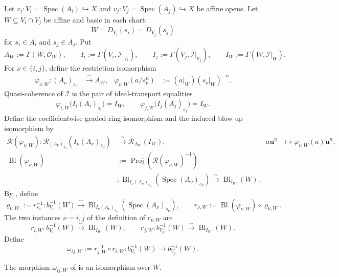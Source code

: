 \begin{definition}
  Let $v_i\colon V_i=\operatorname{Spec}(A_i)\hookrightarrow X$ and
  $v_j\colon V_j=\operatorname{Spec}(A_j)\hookrightarrow X$ be affine
  opens.  Let $W\subseteq V_i\cap V_j$ be affine and basic in each chart:
  \[
    W=D_{V_i}(s_i)=D_{V_j}(s_j)
  \]
  for $s_i\in A_i$ and $s_j\in A_j$.  Put
  \[
    A_W:=\Gamma(W,\mathcal O_W),\qquad
    I_i:=\Gamma(V_i,\mathcal I|_{V_i}),\qquad
    I_j:=\Gamma(V_j,\mathcal I|_{V_j}),\qquad
    I_W:=\Gamma(W,\mathcal I|_W).
  \]
  For $\nu\in\{i,j\}$, define the restriction isomorphism
  \[
  \begin{aligned}
    \varphi_{\nu,W}\colon(A_\nu)_{s_\nu}
      &\xrightarrow{\ \sim\ }A_W,&
    \varphi_{\nu,W}(a/s_\nu^n)
      &:=(a|_W)(s_\nu|_W)^{-n}.
  \end{aligned}
  \]
  Quasi-coherence of $\mathcal I$ is the pair of ideal-transport equalities
  \[
    \varphi_{i,W}\bigl(I_i(A_i)_{s_i}\bigr)=I_W,
    \qquad
    \varphi_{j,W}\bigl(I_j(A_j)_{s_j}\bigr)=I_W.       \tag{OB0}
  \]
  Define the coefficientwise graded-ring isomorphism and the induced blow-up
  isomorphism by
  \[
  \begin{aligned}
    \mathcal R(\varphi_{\nu,W})\colon
      \mathcal R_{(A_\nu)_{s_\nu}}(I_\nu(A_\nu)_{s_\nu})
      &\xrightarrow{\ \sim\ }\mathcal R_{A_W}(I_W),&
    a\mathbf u^n&\longmapsto\varphi_{\nu,W}(a)\mathbf u^n,\\
    \operatorname{Bl}(\varphi_{\nu,W})
      &:=\operatorname{Proj}(\mathcal R(\varphi_{\nu,W})^{-1})\\
      &\colon
      \operatorname{Bl}_{I_\nu(A_\nu)_{s_\nu}}
        (\operatorname{Spec}(A_\nu)_{s_\nu})
      \xrightarrow{\ \sim\ }\operatorname{Bl}_{I_W}(W).
  \end{aligned}
  \]
  By , define
  \[
    \varrho_{\nu,W}:=r_{s_\nu}^{-1}\colon
      b_{V_\nu}^{-1}(W)\xrightarrow{\ \sim\ }
      \operatorname{Bl}_{I_\nu(A_\nu)_{s_\nu}}
        (\operatorname{Spec}(A_\nu)_{s_\nu}),
    \qquad
    r_{\nu,W}:=\operatorname{Bl}(\varphi_{\nu,W})\circ\varrho_{\nu,W}.
  \]
  The two instances $\nu=i,j$ of the definition of $r_{\nu,W}$ are
  \[
    r_{i,W}\colon b_{V_i}^{-1}(W)\xrightarrow{\sim}
      \operatorname{Bl}_{I_W}(W),
    \qquad
    r_{j,W}\colon b_{V_j}^{-1}(W)\xrightarrow{\sim}
      \operatorname{Bl}_{I_W}(W).
  \]
  Define
  \[
    \omega_{ij,W}:=r_{j,W}^{-1}\circ r_{i,W}\colon
      b_{V_i}^{-1}(W)
      \longrightarrow
      b_{V_j}^{-1}(W).
  \]
\end{definition}

\begin{lemma}
  \label{lemma:nagata-global-blowup-overlap-basic}

  The morphism $\omega_{ij,W}$ of
   is an isomorphism over
  $W$.
\end{lemma}

